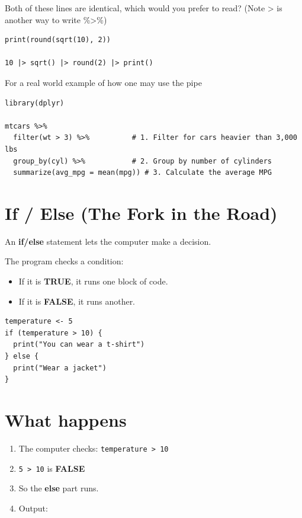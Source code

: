 \documentclass[
  letterpaper,
  DIV=11,
  numbers=noendperiod,
  oneside]{scrreprt}
\begin{document}
Both of these lines are identical, which would you prefer to read? (Note
\textbar\textgreater{} is another way to write \%\textgreater\%)

\begin{verbatim}
print(round(sqrt(10), 2))

10 |> sqrt() |> round(2) |> print()
\end{verbatim}

For a real world example of how one may use the pipe

\begin{verbatim}
library(dplyr)

mtcars %>%
  filter(wt > 3) %>%          # 1. Filter for cars heavier than 3,000 lbs
  group_by(cyl) %>%           # 2. Group by number of cylinders
  summarize(avg_mpg = mean(mpg)) # 3. Calculate the average MPG
\end{verbatim}

\section{If / Else (The Fork in the
Road)}\label{if-else-the-fork-in-the-road}

An \textbf{if/else} statement lets the computer make a decision.

The program checks a condition:

\begin{itemize}
\item
  If it is \textbf{TRUE}, it runs one block of code.
\item
  If it is \textbf{FALSE}, it runs another.
\end{itemize}

\begin{verbatim}
temperature <- 5
if (temperature > 10) {
  print("You can wear a t-shirt")
} else {
  print("Wear a jacket")
}
\end{verbatim}

\section{What happens}\label{what-happens}

\begin{enumerate}
\def\labelenumi{\arabic{enumi}.}
\item
  The computer checks: \texttt{temperature\ \textgreater{}\ 10}
\item
  \texttt{5\ \textgreater{}\ 10} is \textbf{FALSE}
\item
  So the \textbf{else} part runs.
\item
  Output:
\end{enumerate}
\end{document}
